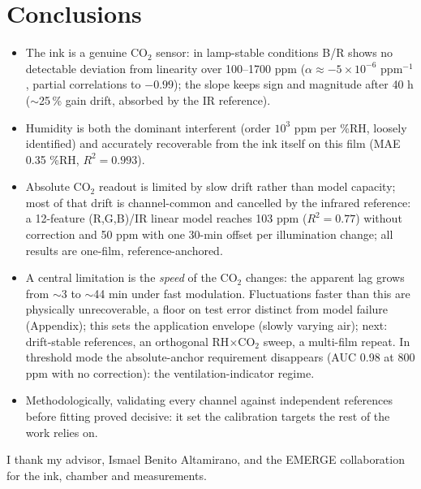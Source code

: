 \documentclass[twocolumn]{revtex4}
\begin{document}
\section{Conclusions}
\begin{itemize}
\item The ink is a genuine CO$_2$ sensor: in lamp-stable conditions
B/R shows no detectable deviation from linearity over 100--1700 ppm
($\alpha \approx -5\times10^{-6}$ ppm$^{-1}$, partial correlations
to $-0.99$); the slope keeps sign and magnitude after 40 h
($\sim$25\,\% gain drift, absorbed by the IR reference).

\item Humidity is both the dominant interferent (order $10^3$ ppm per
\%RH, loosely identified) and accurately recoverable from the ink
itself on this film (MAE 0.35 \%RH, $R^2=0.993$).

\item Absolute CO$_2$ readout is limited by slow drift rather than
model capacity; most of that drift is channel-common and cancelled by the
infrared reference: a 12-feature (R,G,B)/IR linear model reaches 103 ppm
($R^2=0.77$) without correction and 50 ppm with one 30-min offset per
illumination change; all results are one-film, reference-anchored.

\item A central limitation is the \emph{speed} of the CO$_2$ changes:
the apparent lag grows from $\sim$3 to $\sim$44 min under fast
modulation. Fluctuations faster than this are physically unrecoverable, a
floor on test error distinct from model failure (Appendix); this sets the
application envelope (slowly varying air); next: drift-stable references,
an orthogonal RH$\times$CO$_2$ sweep, a multi-film repeat. In threshold mode the absolute-anchor requirement disappears
(AUC 0.98 at 800 ppm with no correction): the ventilation-indicator regime.

\item Methodologically, validating every channel against independent
references before fitting proved decisive: it set the calibration
targets the rest of the work relies on.
\end{itemize}

\begin{acknowledgments}
I thank my advisor, Ismael Benito Altamirano, and the EMERGE
collaboration for the ink, chamber and measurements.
\end{acknowledgments}
\end{document}
